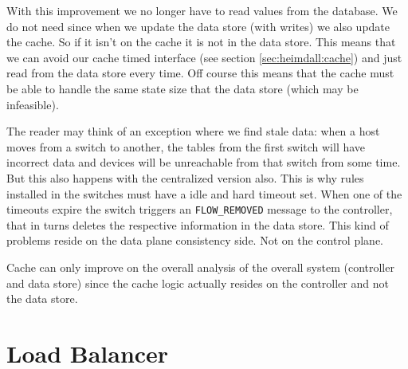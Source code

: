 With this improvement we no longer have to read values from the
database. We do not need since when we update the data store  (with
writes) we also update the cache. So if it isn't on the cache it is not in the
data store. This means that we can avoid our cache timed interface
(see section \ref{sec:heimdall:cache}) and just read from the data
store every time. Off course this means that the cache must be able to
handle the same state size that the data store (which may be
infeasible). 

The reader may think of an exception where we find stale data:
when a host moves from a switch to another, the tables from the first
switch will have  incorrect data and devices will be unreachable from
that switch from some time. But this also happens with the centralized
version also. This is why rules installed in the switches must have a
idle and hard timeout set. When one of the timeouts expire the switch
triggers an \texttt{FLOW\_REMOVED} message to the controller, that in
turns deletes the respective information in the data store.  This kind
of problems reside on the data plane consistency side. Not on the
control plane. 




Cache can only improve on the overall analysis of the overall system
(controller and data store) since the cache logic actually resides on the
controller and not the data store.




\section{Load Balancer}
\label{sec:feasibility:lb}
\glsresetall

